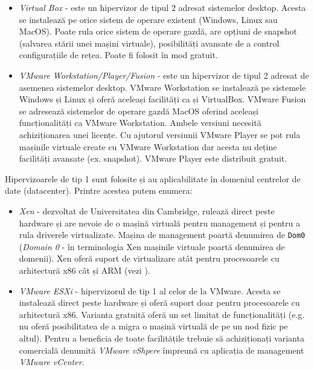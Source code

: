 \begin{itemize}
	\item \textit{Virtual Box} - este un hipervizor de tipul 2 adresat
		sistemelor desktop. Acesta se instalează pe orice sistem de
		operare existent (Windows, Linux sau MacOS). Poate rula orice
		sistem de operare gazdă, are opțiuni de snapshot (salvarea
		stării unei mașini virtuale), posibilități avansate de a control
		configurațiile de rețea. Poate fi folosit în mod gratuit.
	\item \textit{VMware Workstation/Player/Fusion} - este un hipervizor de
		tipul 2 adresat de asemenea sistemelor desktop. VMware
		Workstation se instalează pe sistemele Windows și Linux și oferă
		aceleași facilități ca și VirtualBox. VMware Fusion se adresează
		sistemelor de operare gazdă MacOS oferind aceleași
		funcționalități ca VMware Workstation. Ambele versiuni necesită
		achiziționarea unei licențe. Cu ajutorul versiunii VMware Player
		se pot rula mașinile virtuale create cu VMware Workstation dar
		acesta nu deține facilități avansate (ex. snapshot). VMware Player este
		distribuit gratuit.
\end{itemize}

Hipervizoarele de tip 1 sunt folosite și au aplicabilitate în domeniul centrelor
de date (datacenter). Printre acestea putem enumera:

\begin{itemize}
	\item \textit{Xen} - dezvoltat de Universitatea din Cambridge, rulează
		direct peste hardware și are nevoie de o mașină virtuală pentru
		management și pentru a rula driverele virtualizate. Mașina de
                management poartă denumirea de \texttt{Dom0} (\textit{Domain 0} - în terminologia
		Xen mașinile virtuale poartă denumirea de domenii). Xen oferă suport de virtualizare atât pentru procesoarele cu
		arhitectură x86 cât și ARM (vezi ).
	\item \textit{VMware ESXi} - hipervizorul de tip 1 al celor de la
		VMware. Acesta se instalează direct peste hardware și oferă
		suport doar pentru procesoarele cu arhitectură x86. Varianta
		gratuită oferă un set limitat de funcționalități (e.g. nu oferă
		posibilitatea de a migra o mașină virtuală de pe un nod fizic pe
		altul). Pentru a beneficia de toate facilitățile trebuie să
		achiziționați varianta comercială denumită \textit{VMware
		vShpere} împreună cu aplicația de management \textit{VMware
		vCenter}.
\end{itemize}

